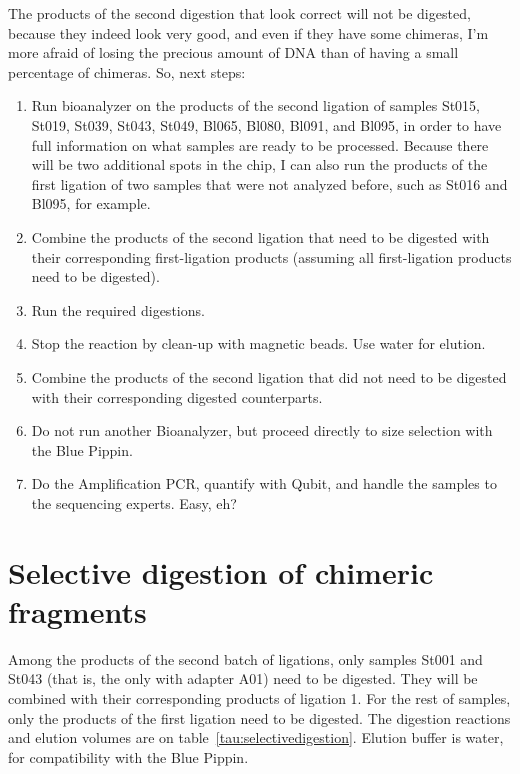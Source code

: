 \documentclass[a4paper,12pt,twosided]{article}
\begin{document}
The products of the second digestion that look correct will not be digested, because they indeed look very good, and even if they have some chimeras, I'm more afraid of losing the precious amount of DNA than of having a small percentage of chimeras. So, next steps:
\begin{enumerate}
  \item Run bioanalyzer on the products of the second ligation of samples St015, St019, St039, St043, St049, Bl065, Bl080, Bl091, and Bl095, in order to have full information on what samples are ready to be processed. Because there will be two additional spots in the chip, I can also run the products of the first ligation of two samples that were not analyzed before, such as St016 and Bl095, for example.
  \item Combine the products of the second ligation that need to be digested with their corresponding first-ligation products (assuming all first-ligation products need to be digested).
  \item Run the required digestions.
  \item Stop the reaction by clean-up with magnetic beads. Use water for elution.
  \item Combine the products of the second ligation that did not need to be digested with their corresponding digested counterparts.
  \item Do not run another Bioanalyzer, but proceed directly to size selection with the Blue Pippin.
  \item Do the Amplification PCR, quantify with Qubit, and handle the samples to the sequencing experts. Easy, eh?
\end{enumerate}

\section{Selective digestion of chimeric fragments}
Among the products of the second batch of ligations, only samples St001 and St043 (that is, the only with adapter A01) need to be digested. They will be combined with their corresponding products of ligation 1. For the rest of samples, only the products of the first ligation need to be digested. The digestion reactions and elution volumes are on table~\ref{tau:selectivedigestion}. Elution buffer is water, for compatibility with the Blue Pippin.
\end{document}
